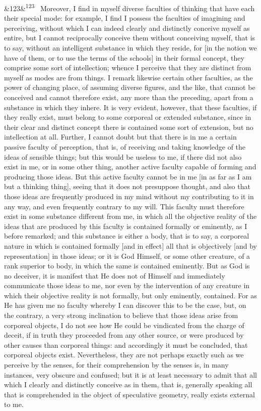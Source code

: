 \documentclass[12pt]{article}
\newcommand{\para}[1][]{\par\noindent\ifx&#1&\else\textsuperscript{\footnotesize #1}~\fi}
\begin{document}
\para[123] Moreover, I find in myself diverse faculties of thinking that have each their special mode: for example, I find I possess the faculties of imagining and perceiving, without which I can indeed clearly and distinctly conceive myself as entire, but I cannot reciprocally conceive them without conceiving myself, that is to say, without an intelligent substance in which they reside, for [in the notion we have of them, or to use the terms of the schools] in their formal concept, they comprise some sort of intellection; whence I perceive that they are distinct from myself as modes are from things. I remark likewise certain other faculties, as the power of changing place, of assuming diverse figures, and the like, that cannot be conceived and cannot therefore exist, any more than the preceding, apart from a substance in which they inhere. It is very evident, however, that these faculties, if they really exist, must belong to some corporeal or extended substance, since in their clear and distinct concept there is contained some sort of extension, but no intellection at all. Further, I cannot doubt but that there is in me a certain passive faculty of perception, that is, of receiving and taking knowledge of the ideas of sensible things; but this would be useless to me, if there did not also exist in me, or in some other thing, another active faculty capable of forming and producing those ideas. But this active faculty cannot be in me [in as far as I am but a thinking thing], seeing that it does not presuppose thought, and also that those ideas are frequently produced in my mind without my contributing to it in any way, and even frequently contrary to my will. This faculty must therefore exist in some substance different from me, in which all the objective reality of the ideas that are produced by this faculty is contained formally or eminently, as I before remarked; and this substance is either a body, that is to say, a corporeal nature in which is contained formally [and in effect] all that is objectively [and by representation] in those ideas; or it is God Himself, or some other creature, of a rank superior to body, in which the same is contained eminently. But as God is no deceiver, it is manifest that He does not of Himself and immediately communicate those ideas to me, nor even by the intervention of any creature in which their objective reality is not formally, but only eminently, contained. For as He has given me no faculty whereby I can discover this to be the case, but, on the contrary, a very strong inclination to believe that those ideas arise from corporeal objects, I do not see how He could be vindicated from the charge of deceit, if in truth they proceeded from any other source, or were produced by other causes than corporeal things: and accordingly it must be concluded, that corporeal objects exist. Nevertheless, they are not perhaps exactly such as we perceive by the senses, for their comprehension by the senses is, in many instances, very obscure and confused; but it is at least necessary to admit that all which I clearly and distinctly conceive as in them, that is, generally speaking all that is comprehended in the object of speculative geometry, really exists external to me.
\end{document}
